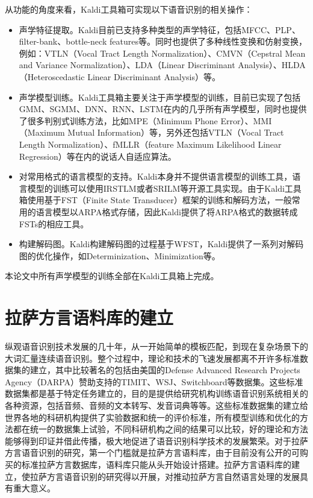 从功能的角度来看，Kaldi工具箱可实现以下语音识别的相关操作：
\begin{itemize}
  \item 声学特征提取。Kaldi目前已支持多种类型的声学特征，包括MFCC、PLP、filter-bank、bottle-neck features等。同时也提供了多种线性变换和仿射变换，例如：VTLN（Vocal Tract Length Normalization）、CMVN（Cepstral Mean and Variance Normalization）、LDA（Linear Discriminant Analysis）、HLDA（Heteroscedastic Linear Discriminant Analysis）等。
  \item 声学模型训练。Kaldi工具箱主要关注于声学模型的训练，目前已实现了包括GMM、SGMM、DNN、RNN、LSTM在内的几乎所有声学模型，同时也提供了很多判别式训练方法，比如MPE（Minimum Phone Error）、MMI（Maximum Mutual Information）等，另外还包括VTLN（Vocal Tract Length Normalization）、fMLLR（feature Maximum Likelihood Linear Regression）等在内的说话人自适应算法。
  \item 对常用格式的语言模型的支持。Kaldi本身并不提供语言模型的训练工具，语言模型的训练可以使用IRSTLM或者SRILM等开源工具实现。由于Kaldi工具箱使用基于FST（Finite State Transducer）框架的训练和解码方法，一般常用的语言模型以ARPA格式存储，因此Kaldi提供了将ARPA格式的数据转成FSTs的相应工具。
  \item 构建解码图。Kaldi构建解码图的过程基于WFST\cite{mohri2002weighted}，Kaldi提供了一系列对解码图的优化操作，如Determinization、Minimization等。
\end{itemize}

本论文中所有声学模型的训练全部在Kaldi工具箱上完成。

\section{拉萨方言语料库的建立}\label{Lhasa corpus}
纵观语音识别技术发展的几十年，从一开始简单的模板匹配，到现在复杂场景下的大词汇量连续语音识别。整个过程中，理论和技术的飞速发展都离不开许多标准数据集的建立，其中比较著名的包括由美国的Defense Advanced Research Projects Agency（DARPA）赞助支持的TIMIT\cite{garofolo1993darpa}、WSJ\cite{paul1992design}、Switchboard\cite{godfrey1992switchboard}等数据集。这些标准数据集都是基于特定任务建立的，目的是提供给研究机构训练语音识别系统相关的各种资源，包括音频、音频的文本转写、发音词典等等。这些标准数据集的建立给世界各地的科研机构提供了实验数据和统一的评价标准，所有模型训练和优化的方法都在统一的数据集上试验，不同科研机构之间的结果可以比较，好的理论和方法能够得到印证并借此传播，极大地促进了语音识别科学技术的发展繁荣。对于拉萨方言语音识别的研究，第一个门槛就是拉萨方言语料库，由于目前没有公开的可购买的标准拉萨方言数据库，语料库只能从头开始设计搭建。拉萨方言语料库的建立，使拉萨方言语音识别的研究得以开展，对推动拉萨方言自然语言处理的发展具有重大意义。
